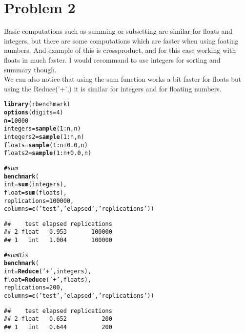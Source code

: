 \documentclass{llncs}\usepackage[]{graphicx}\usepackage[]{color}
\makeatletter
\newcommand{\hlnum}[1]{\textcolor[rgb]{0.686,0.059,0.569}{#1}}%
\newcommand{\hlstr}[1]{\textcolor[rgb]{0.192,0.494,0.8}{#1}}%
\newcommand{\hlcom}[1]{\textcolor[rgb]{0.678,0.584,0.686}{\textit{#1}}}%
\newcommand{\hlopt}[1]{\textcolor[rgb]{0,0,0}{#1}}%
\newcommand{\hlstd}[1]{\textcolor[rgb]{0.345,0.345,0.345}{#1}}%
\newcommand{\hlkwb}[1]{\textcolor[rgb]{0.69,0.353,0.396}{#1}}%
\newcommand{\hlkwc}[1]{\textcolor[rgb]{0.333,0.667,0.333}{#1}}%
\newcommand{\hlkwd}[1]{\textcolor[rgb]{0.737,0.353,0.396}{\textbf{#1}}}%
\newenvironment{kframe}{%
 \def\at@end@of@kframe{}%
 \ifinner\ifhmode%
  \def\at@end@of@kframe{\end{minipage}}%
  \begin{minipage}{\columnwidth}%
 \fi\fi%
 \def\FrameCommand##1{\hskip\@totalleftmargin \hskip-\fboxsep
 \colorbox{shadecolor}{##1}\hskip-\fboxsep
     \hskip-\linewidth \hskip-\@totalleftmargin \hskip\columnwidth}%
 \MakeFramed {\advance\hsize-\width
   \@totalleftmargin\z@ \linewidth\hsize
   \@setminipage}}%
 {\par\unskip\endMakeFramed%
 \at@end@of@kframe}
\newenvironment{knitrout}{}{} %
\makeatother
\begin{document}
\section{Problem 2}
Basic computations such as summing or subsetting are similar for floats and integers, but there are some computations which are faster when using foating numbers. And example of this is crossproduct, and for this case working with floats in much faster. I would recommand to use integers for sorting and summary though.\\
We can also notice that using the sum function works a bit faster for floats but using the Reduce('+',) it is similar for integers and for floating numbers. 
\begin{knitrout}
\color{fgcolor}\begin{kframe}
\begin{alltt}
\hlkwd{library}\hlstd{(rbenchmark)}
\hlkwd{options}\hlstd{(}\hlkwc{digits} \hlstd{=} \hlnum{4}\hlstd{)}
\hlstd{n}\hlkwb{=}\hlnum{10000}
\hlstd{integers}\hlkwb{=}\hlkwd{sample}\hlstd{(}\hlnum{1}\hlopt{:}\hlstd{n,n)}
\hlstd{integers2}\hlkwb{=}\hlkwd{sample}\hlstd{(}\hlnum{1}\hlopt{:}\hlstd{n,n)}
\hlstd{floats}\hlkwb{=}\hlkwd{sample}\hlstd{(}\hlnum{1}\hlopt{:}\hlstd{n}\hlopt{+}\hlnum{0.0}\hlstd{,n)}
\hlstd{floats2}\hlkwb{=}\hlkwd{sample}\hlstd{(}\hlnum{1}\hlopt{:}\hlstd{n}\hlopt{+}\hlnum{0.0}\hlstd{,n)}

\hlcom{#sum}
\hlkwd{benchmark}\hlstd{(}
  \hlkwc{int} \hlstd{=} \hlkwd{sum}\hlstd{(integers) ,}
  \hlkwc{float} \hlstd{=} \hlkwd{sum}\hlstd{(floats),}
  \hlkwc{replications} \hlstd{=} \hlnum{100000}\hlstd{,}
  \hlkwc{columns}\hlstd{=}\hlkwd{c}\hlstd{(}\hlstr{'test'}\hlstd{,} \hlstr{'elapsed'}\hlstd{,} \hlstr{'replications'}\hlstd{))}
\end{alltt}
\begin{lstlisting}[basicstyle=\ttfamily,breaklines=true]
##    test elapsed replications
## 2 float   0.953       100000
## 1   int   1.004       100000
\end{lstlisting}
\begin{alltt}
\hlcom{#sumBis}
\hlkwd{benchmark}\hlstd{(}
  \hlkwc{int} \hlstd{=} \hlkwd{Reduce}\hlstd{(}\hlstr{'+'}\hlstd{,integers) ,}
  \hlkwc{float} \hlstd{=} \hlkwd{Reduce}\hlstd{(}\hlstr{'+'}\hlstd{,floats),}
  \hlkwc{replications} \hlstd{=} \hlnum{200}\hlstd{,}
  \hlkwc{columns}\hlstd{=}\hlkwd{c}\hlstd{(}\hlstr{'test'}\hlstd{,} \hlstr{'elapsed'}\hlstd{,} \hlstr{'replications'}\hlstd{))}
\end{alltt}
\begin{lstlisting}[basicstyle=\ttfamily,breaklines=true]
##    test elapsed replications
## 2 float   0.652          200
## 1   int   0.644          200
\end{lstlisting}
\end{kframe}
\end{knitrout}
\end{document}
